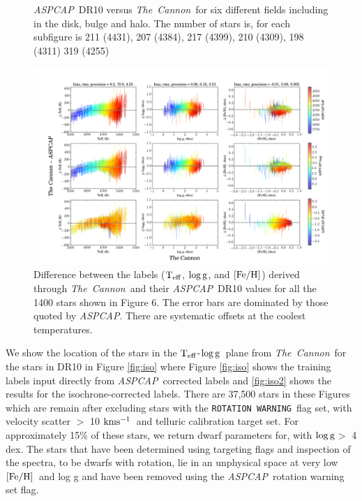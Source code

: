 \documentclass[12pt, preprint]{aastex}
\newcommand{\teff}{\mbox{$\rm T_{eff}$}}
\newcommand{\kms}{\mbox{$\rm kms^{-1}$}}
\newcommand{\feh}{\mbox{$\rm [Fe/H]$}}
\newcommand{\logg}{\mbox{$\rm \log g$}}
\newcommand{\tc}{\textsl{The~Cannon}}
\newcommand{\aspcap}{\textsl{ASPCAP}}
\newcommand{\rotwarn}{\texttt{ROTATION WARNING}}
\begin{document}
\begin{figure}[!h]
\caption{\small{\aspcap\ DR10 versus \tc\ for six different fields including in the disk, bulge and halo. The number of stars is, for each subfigure is 211 (4431), 207 (4384), 217 (4399), 210 (4309), 198 (4311) 319 (4255) }}
\label{fig:cal}
\end{figure}

\begin{figure}[!h]
\centering
        \includegraphics[scale=0.35]{./plots/cplot2.png} 
\caption{Difference between the labels (\teff, \logg, and \feh) derived through \tc\ and their \aspcap\ DR10 values for all the 1400 stars shown in Figure 6. The error bars are dominated by those quoted by \aspcap. There are systematic offsets at the coolest temperatures.}
\label{fig:cplot}
\end{figure}


We show the location of the stars in the \teff-\logg\ plane from \tc\ for the stars in DR10 in Figure \ref{fig:iso} where Figure \ref{fig:iso} shows the training labels input directly from \aspcap\ corrected labels and \ref{fig:iso2} shows the results for the isochrone-corrected labels. There are 37,500 stars in these Figures which are remain after excluding stars with the \rotwarn\ flag set, with velocity scatter $>$ 10 \kms\ and telluric calibration target set. For approximately 15\% of these stars, we return dwarf parameters for, with \logg $>$ 4 dex.  The stars that have been determined using targeting flags and inspection of the spectra, to be dwarfs with rotation, lie in an unphysical space at very low \feh\ and log g and have been removed using the \aspcap\ rotation warning set flag. 
\end{document}

